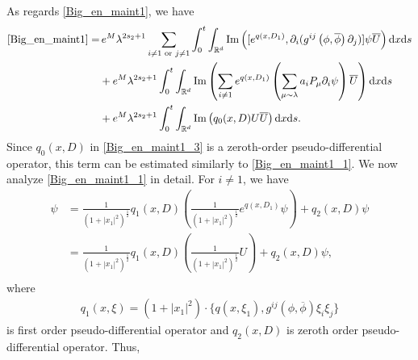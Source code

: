 \documentclass[10pt,twoside,a4paper]{article}
\numberwithin{equation}{section}\allowdisplaybreaks
\begin{document}
As regards  \eqref{Big_en_maint1}, we have
\begin{align}
	\eqref{Big_en_maint1}=&\,	e^{M}\lambda^{2s_2+1} \sum_{ i\neq 1\text{ or } j\neq 1}	\int_0^t \int_{\mathbb{R}^d}  \mathrm{Im} \left(  [e^{q (x,D_1)}, \partial_i  (g^{ij}\left(\phi,\overline{\phi}\right) \partial_j)] \psi \overline{U}\right)  \mathrm{d} x \mathrm{d} s \label{Big_en_maint1_1} \\
	&+e^{M}\lambda^{2s_2+1}\int_0^t \int_{\mathbb{R}^d}  \mathrm{Im} \left(   \sum_{ i\neq 1} e^{q (x,D_1)} \left(\sum_{\mu\sim \lambda} a_i  P_\mu \partial_i \psi \right) \overline{U}\right)  \mathrm{d} x \mathrm{d} s \label{Big_en_maint1_2} \\
	&+e^{M}\lambda^{2s_2+1}\int_0^t \int_{\mathbb{R}^d}  \mathrm{Im} \left(    q_0(x,D) U\overline{U}\right)  \mathrm{d} x \mathrm{d} s.  \label{Big_en_maint1_3}
\end{align}
Since \( q_0(x,D) \) in \eqref{Big_en_maint1_3} is a zeroth-order pseudo-differential operator, this term can be estimated similarly to \eqref{Big_en_maint1_1}. We now analyze \eqref{Big_en_maint1_1} in detail.
For   $ i\neq 1 $, we have
\begin{align*}
	[e^{q (x,D_1)}, \partial_i  (g^{ij}\left(\phi,\overline{\phi}\right) \partial_j)] \psi&=   \frac{1}{ (1+ |x_1| ^2)^{\frac 12} }q_1(x,D)  (\frac{1}{ (1+ |x_1| ^2)^{\frac 12} }e^{q (x,D_1)} \psi) +q_2(x,D)   \psi\\
	&=  \frac{1}{ (1+ |x_1| ^2)^{\frac 12} }q_1(x,D)( \frac{1}{ (1+ |x_1| ^2)^{\frac 12} }U) +q_2(x,D)   \psi,\\
\end{align*}
where  
\begin{align*}
	q_1(x,\xi)=( 1+ |x_1| ^2 )\cdot \{q(x,\xi_1),  g^{ij}\left(\phi,\overline{\phi}\right)\xi_i \xi_j  \}
\end{align*}
is first order pseudo-differential operator and $ q_2(x,D) $ is  zeroth order pseudo-differential operator. Thus,
\end{document}
